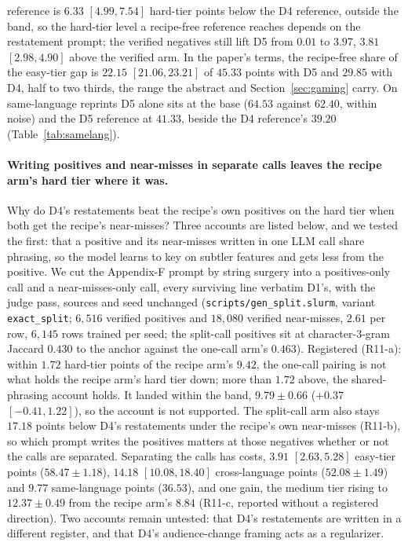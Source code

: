 reference is $6.33$ $[4.99, 7.54]$ hard-tier points below the D4 reference, outside the band, so the hard-tier level a recipe-free reference reaches depends on the restatement prompt; the verified negatives still lift D5 from $0.01$ to $3.97$, $3.81$ $[2.98, 4.90]$ above the verified arm. In the paper's terms, the recipe-free share of the easy-tier gap is $22.15$ $[21.06, 23.21]$ of $45.33$ points with D5 and $29.85$ with D4, half to two thirds, the range the abstract and Section~\ref{sec:gaming} carry. On same-language reprints D5 alone sits at the base ($64.53$ against $62.40$, within noise) and the D5 reference at $41.33$, beside the D4 reference's $39.20$ (Table~\ref{tab:samelang}).

\paragraph{Writing positives and near-misses in separate calls leaves the recipe arm's hard tier where it was.}
Why do D4's restatements beat the recipe's own positives on the hard tier when both get the recipe's near-misses? Three accounts are listed below, and we tested the first: that a positive and its near-misses written in one LLM call share phrasing, so the model learns to key on subtler features and gets less from the positive. We cut the Appendix-F prompt by string surgery into a positives-only call and a near-misses-only call, every surviving line verbatim D1's, with the judge pass, sources and seed unchanged (\texttt{scripts/gen\_split.slurm}, variant \texttt{exact\_split}; $6{,}516$ verified positives and $18{,}080$ verified near-misses, $2.61$ per row, $6{,}145$ rows trained per seed; the split-call positives sit at character-$3$-gram Jaccard $0.430$ to the anchor against the one-call arm's $0.463$). Registered (R11-a): within $1.72$ hard-tier points of the recipe arm's $9.42$, the one-call pairing is not what holds the recipe arm's hard tier down; more than $1.72$ above, the shared-phrasing account holds. It landed within the band, $9.79 \pm 0.66$ ($+0.37$ $[-0.41, 1.22]$), so the account is not supported. The split-call arm also stays $17.18$ points below D4's restatements under the recipe's own near-misses (R11-b), so which prompt writes the positives matters at those negatives whether or not the calls are separated. Separating the calls has costs, $3.91$ $[2.63, 5.28]$ easy-tier points ($58.47 \pm 1.18$), $14.18$ $[10.08, 18.40]$ cross-language points ($52.08 \pm 1.49$) and $9.77$ same-language points ($36.53$), and one gain, the medium tier rising to $12.37 \pm 0.49$ from the recipe arm's $8.84$ (R11-c, reported without a registered direction). Two accounts remain untested: that D4's restatements are written in a different register, and that D4's audience-change framing acts as a regularizer.

